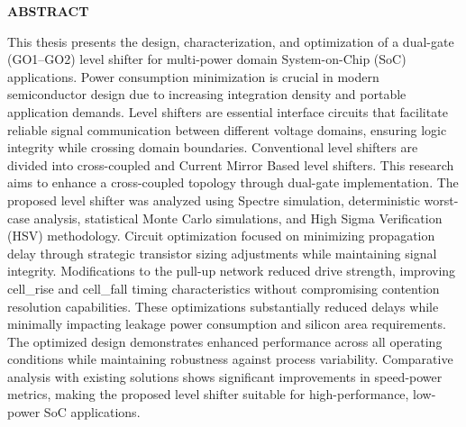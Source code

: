 \begin{spacing}{2.0}
\begin{flushright}
\begin{minipage}{0.5\textwidth}
\begin{center}
    {\large\bfseries ABSTRACT}
\end{center}
\begin{spacing}{1.5}
     This thesis presents the design, characterization, and optimization of a dual-gate (GO1–GO2) level shifter for multi-power domain System-on-Chip (SoC) applications. Power consumption minimization is crucial in modern semiconductor design due to increasing integration density and portable application demands. Level shifters are essential interface circuits that facilitate reliable signal communication between different voltage domains, ensuring logic integrity while crossing domain boundaries. Conventional level shifters are divided into cross-coupled and Current Mirror Based level shifters. This research aims to enhance a cross-coupled topology through dual-gate implementation. The proposed level shifter was analyzed using Spectre simulation, deterministic worst-case analysis, statistical Monte Carlo simulations, and High Sigma Verification (HSV) methodology. Circuit optimization focused on minimizing propagation delay through strategic transistor sizing adjustments while maintaining signal integrity. Modifications to the pull-up network reduced drive strength, improving cell\_rise and cell\_fall timing characteristics without compromising contention resolution capabilities. These optimizations substantially reduced delays while minimally impacting leakage power consumption and silicon area requirements. The optimized design demonstrates enhanced performance across all operating conditions while maintaining robustness against process variability. Comparative analysis with existing solutions shows significant improvements in speed-power metrics, making the proposed level shifter suitable for high-performance, low-power SoC applications.
\end{spacing}


\newpage


\tableofcontents %
\listoffigures
\listoftables


\end{minipage}
\end{flushright}
\end{spacing}
